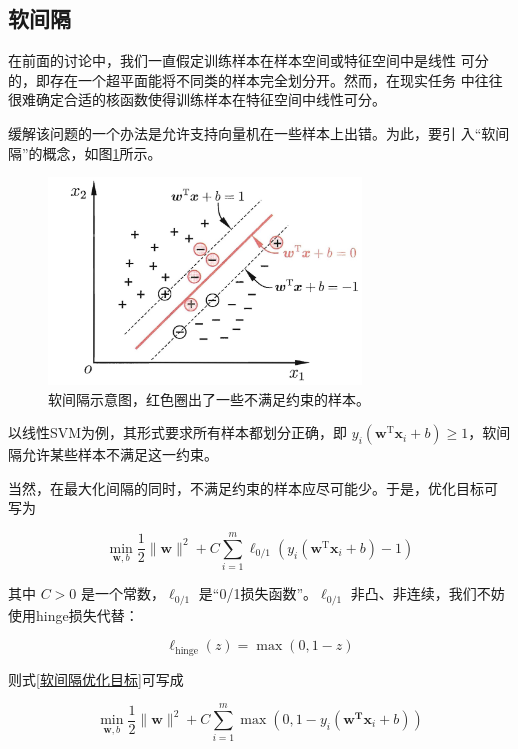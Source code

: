 \documentclass{ctexart}
\begin{document}
	
	\subsection{软间隔}
	在前面的讨论中，我们一直假定训练样本在样本空间或特征空间中是线性
	可分的，即存在一个超平面能将不同类的样本完全划分开。然而，在现实任务
	中往往很难确定合适的核函数使得训练样本在特征空间中线性可分。
	
	缓解该问题的一个办法是允许支持向量机在一些样本上出错。为此，要引
	入“软间隔”的概念，如图\ref{软间隔图}所示。
	
	\begin{figure}[!htb]
		\centering
		\includegraphics[height=5.5cm]{../image/软间隔.png}
		\caption{软间隔示意图，红色圈出了一些不满足约束的样本。}
		\label{软间隔图}
	\end{figure}
	
	以线性SVM为例，其形式要求所有样本都划分正确，即 $y_{i}\left(\boldsymbol{w}^{\mathrm{T}} \boldsymbol{x}_{i}+b\right) \geqslant 1$，软间隔允许某些样本不满足这一约束。
	
	当然，在最大化间隔的同时，不满足约束的样本应尽可能少。于是，优化目标可
	写为
	
	\begin{equation}
		\min _{\boldsymbol{w}, b} \frac{1}{2}\|\boldsymbol{w}\|^{2}+C \sum_{i=1}^{m} \ell_{0 / 1}\left(y_{i}\left(\boldsymbol{w}^{\mathrm{T}} \boldsymbol{x}_{i}+b\right)-1\right)
		\label{软间隔优化目标}
	\end{equation}
	
	其中 $C>0$ 是一个常数，$\ell_{0/1}$ 是“0/1损失函数”。$\ell_{0/1}$ 非凸、非连续，我们不妨使用hinge损失代替：
	
	\begin{equation}
		\ell_{\text{hinge}}(z)=\max(0,1-z)
	\end{equation}
	
	则式\eqref{软间隔优化目标}可写成
	
	\begin{equation}
		\min _{\boldsymbol{w}, b} \frac{1}{2}\|\boldsymbol{w}\|^{2}+C \sum_{i=1}^{m} \max \left(0,1-y_{i}\left(\boldsymbol{w}^{\mathbf{T}} \boldsymbol{x}_{i}+b\right)\right)
		\label{软间隔用hinge}
	\end{equation}
	
\end{document}
